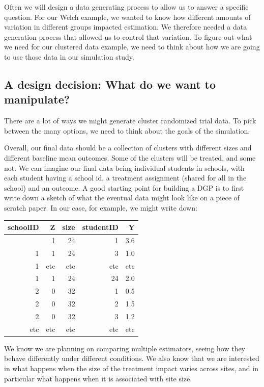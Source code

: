 \documentclass[
]{book}
\begin{document}
Often we will design a data generating process to allow us to answer a specific question.
For our Welch example, we wanted to know how different amounts of variation in different groups impacted estimation.
We therefore needed a data generation process that allowed us to control that variation.
To figure out what we need for our clustered data example, we need to think about how we are going to use those data in our simulation study.

\subsection{A design decision: What do we want to manipulate?}\label{a-design-decision-what-do-we-want-to-manipulate}

There are a lot of ways we might generate cluster randomized trial data.
To pick between the many options, we need to think about the goals of the simulation.

Overall, our final data should be a collection of clusters with different sizes and different baseline mean outcomes.
Some of the clusters will be treated, and some not.
We can imagine our final data being individual students in schools, with each student having a school id, a treatment assignment (shared for all in the school) and an outcome.
A good starting point for building a DGP is to first write down a sketch of what the eventual data might look like on a piece of scratch paper.
In our case, for example, we might write down:

\begin{longtable}[]{@{}rrrrr@{}}
\toprule\noalign{}
schoolID & Z & size & studentID & Y \\
\midrule\noalign{}
\endhead
\bottomrule\noalign{}
\endlastfoot
1 & 1 & 24 & 1 & 3.6 \\
1 & 1 & 24 & 3 & 1.0 \\
1 & etc & etc & etc & etc \\
1 & 1 & 24 & 24 & 2.0 \\
2 & 0 & 32 & 1 & 0.5 \\
2 & 0 & 32 & 2 & 1.5 \\
2 & 0 & 32 & 3 & 1.2 \\
etc & etc & etc & etc & etc \\
\end{longtable}

We know we are planning on comparing multiple estimators, seeing how they behave differently under different conditions.
We also know that we are interested in what happens when the size of the treatment impact varies across sites, and in particular what happens when it is associated with site size.
\end{document}
